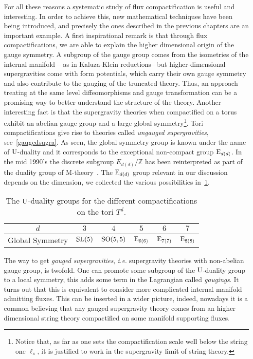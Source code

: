 \documentclass[debug]{phd}
\begin{document}
				For all these reasons a systematic study of flux compactification is useful and interesting.
				In order to achieve this, new mathematical techniques have been being introduced, and precisely the ones described in the previous chapters are an important example.
				A first inspirational remark is that through flux compactifications, we are able to explain the higher dimensional origin of the gauge symmetry.
				A subgroup of the gauge group comes from the isometries of the internal manifold -- as in Kaluza-Klein reductions-- but higher-dimensional supergravities come with form potentials, which carry their own gauge symmetry and also contribute to the gauging of the truncated theory.
				Thus, an approach treating at the same level diffeomorphisms and gauge transformation can be a promising way to better understand the structure of the theory. 
				Another interesting fact is that the supergravity theories when compactified on a torus exhibit an abelian gauge group and a large global symmetry\footnote{
					Notice that, as far as one sets the compactification scale well below the string one $\ell_s$, it is justified to work in the supergravity limit of string theory.}.
				Tori compactifications give rise to theories called \emph{ungauged supergravities}, see~\cref{gaugedsugra}.
				As seen, the global symmetry group is known under the name of $\mathrm{U}$-duality and it corresponds to the exceptional non-compact group $\mathrm{E}_{d(d)}$.
				In the mid 1990's the discrete subgroup $E_{d(d)}/\mathbb{Z}$ has been reinterpreted as part of the duality group of M-theory~\cite{hulldualities}. 
				The $\mathrm{E}_{d(d)}$ group relevant in our discussion depends on the dimension, we collected the various possibilities in~\cref{Udualtab}.
							\begin{table}[h!]
							\centering
								\begin{tabular}{c c c c c c}
									$d$					&		$3$			&		$4$			&		$5$		&		$6$		&		$7$		\\
										\midrule
									Global Symmetry		&	$\mathrm{SL}(5)$	& 	$\mathrm{SO}(5,5)$	&	$\mathrm{E}_{6(6)}$	&	$\mathrm{E}_{7(7)}$	&	$\mathrm{E}_{8(8)}$	
								\end{tabular}
								\caption{The $\mathrm{U}$-duality groups for the different compactifications on the tori $T^d$.}
								\label{Udualtab}
							\end{table}
				
				The way to get \emph{gauged supergravities}, \emph{i.e.} supergravity theories with non-abelian gauge group, is twofold.
				One can promote some subgroup of the $\mathrm{U}$-duality group to a local symmetry, this adds some term in the Lagrangian called \emph{gaugings}.
				It turns out that this is equivalent to consider more complicated internal manifold admitting fluxes.
				This can be inserted in a wider picture, indeed, nowadays it is a common believing that any gauged supergravity theory comes from an higher dimensional string theory compactified on some manifold supporting fluxes.
				
\end{document}
